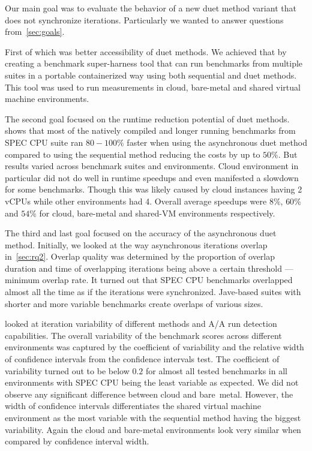 
Our main goal was to evaluate the behavior of a new duet method variant that does not synchronize iterations.
Particularly we wanted to answer questions from~\cref{sec:goals}.

First of which was better accessibility of duet methods.
We achieved that by creating a benchmark super-harness tool that can run benchmarks from multiple suites in a portable containerized way using both sequential and duet methods.
This tool was used to run measurements in cloud, bare-metal and shared virtual machine environments.

The second goal focused on the runtime reduction potential of duet methods.
 shows that most of the natively compiled and longer running benchmarks from SPEC CPU suite ran $80 - 100\%$ faster when using the asynchronous duet method compared to using the sequential method reducing the costs by up to $50\%$.
But results varied across benchmark suites and environments.
Cloud environment in particular did not do well in runtime speedups and even manifested a slowdown for some benchmarks.
Though this was likely caused by cloud instances having 2 vCPUs while other environments had 4.
Overall average speedups were $8\%$, $60\%$ and $54\%$ for cloud, \mbox{bare-metal} and \mbox{shared-VM} environments respectively.

The third and last goal focused on the accuracy of the asynchronous duet method.
Initially, we looked at the way asynchronous iterations overlap in~\cref{sec:rq2}.
Overlap quality was determined by the proportion of overlap duration and time of overlapping iterations being above a certain threshold --- minimum overlap rate.
It turned out that SPEC CPU benchmarks overlapped almost all the time as if the iterations were synchronized.
\mbox{Jave-based} suites with shorter and more variable benchmarks create overlaps of various sizes.

 looked at iteration variability of different methods and A/A run detection capabilities.
The overall variability of the benchmark scores across different environments was captured by the coefficient of variability and the relative width of confidence intervals from the confidence intervals test.
The coefficient of variability turned out to be below $0.2$ for almost all tested benchmarks in all environments with SPEC CPU being the least variable as expected.
We did not observe any significant difference between cloud and \mbox{bare metal}.
However, the width of confidence intervals differentiates the shared virtual machine environment as the most variable with the sequential method having the biggest variability.
Again the cloud and \mbox{bare-metal} environments look very similar when compared by confidence interval width.

